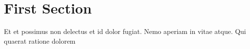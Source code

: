 \documentclass{article}
\begin{document}
	\section{First Section}
		Et et possimus non delectus et id dolor fugiat. Nemo aperiam in vitae atque. 
		Qui  quaerat ratione dolorem 
\end{document}
